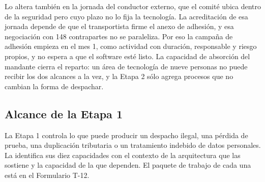 
Lo altera también en la jornada del conductor externo, que el comité ubica dentro de la seguridad pero
cuyo plazo no lo fija la tecnología. La acreditación de esa jornada depende de que el transportista
firme el anexo de adhesión, y esa negociación con 148 contrapartes no se paraleliza. Por eso la
campaña de adhesión empieza en el mes 1, como actividad con duración, responsable y riesgo propios, y
no espera a que el software esté listo. La capacidad de absorción del mandante cierra el reparto: un
área de tecnología de nueve personas  no puede recibir los dos
alcances a la vez, y la Etapa 2 sólo agrega procesos que no cambian la forma de despachar.

\subsection{Alcance de la Etapa 1}\label{sec:3-etapa1}

La Etapa 1 controla lo que puede producir un despacho ilegal, una pérdida de prueba, una duplicación
tributaria o un tratamiento indebido de datos personales. La  identifica sus diez
capacidades con el contexto de la arquitectura que las sostiene y la capacidad de la que dependen. El
paquete de trabajo de cada una está en el Formulario T-12.

